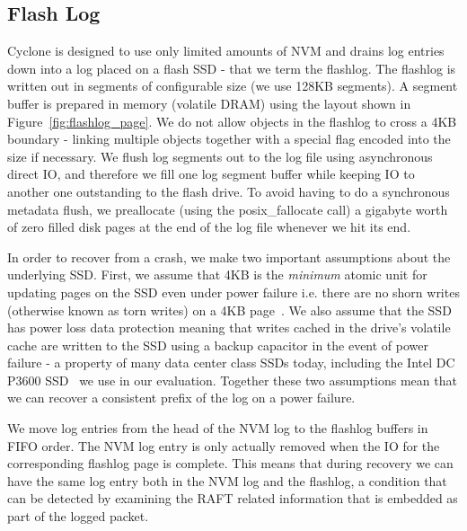 \documentclass[10pt, preprint, nonatbib]{sigplanconf}
\begin{document}
\subsection{Flash Log}
Cyclone is designed to use only limited amounts of NVM and drains log entries
down into a log placed on a flash SSD - that we term the flashlog. The flashlog
is written out in segments of configurable size (we use 128KB segments). A
segment buffer is prepared in memory (volatile DRAM) using the layout shown in
Figure~\ref{fig:flashlog_page}. We do not allow objects in the flashlog to cross
a 4KB boundary - linking multiple objects together with a special flag encoded
into the size if necessary. We flush log segments out to the log file using
asynchronous direct IO, and therefore we fill one log segment buffer while
keeping IO to another one outstanding to the flash drive. To avoid having to do
a synchronous metadata flush, we preallocate (using the posix\_fallocate call) a
gigabyte worth of zero filled disk pages at the end of the log file whenever we
hit its end.

In order to recover from a crash, we make two important assumptions about the
underlying SSD. First, we assume that 4KB is the \emph{minimum} atomic unit for
updating pages on the SSD even under power failure i.e. there are no shorn
writes (otherwise known as torn writes) on a 4KB page~\cite{shorn_writes}. We
also assume that the SSD has power loss data protection meaning that writes
cached in the drive's volatile cache are written to the SSD using a backup
capacitor in the event of power failure - a property of many data center class
SSDs today, including the Intel DC P3600 SSD~\cite{ssd_spec} we use in our
evaluation. Together these two assumptions mean that we can recover a consistent
prefix of the log on a power failure.

We move log entries from the head of the NVM log to the flashlog buffers in FIFO
order. The NVM log entry is only actually removed when the IO for the
corresponding flashlog page is complete. This means that during recovery we can
have the same log entry both in the NVM log and the flashlog, a condition that
can be detected by examining the RAFT related information that is embedded as
part of the logged packet.
\end{document}

